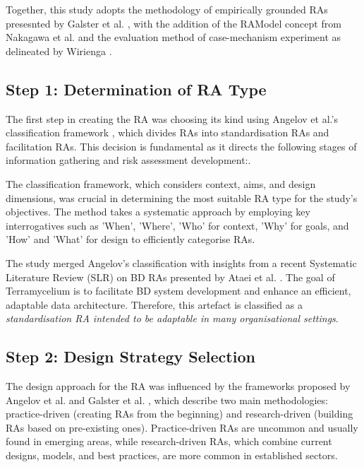 \documentclass[preprint,12pt]{elsarticle}
\begin{document}
Together, this study adopts the methodology of empirically grounded RAs presesnted by Galster et al. \cite{GALSTER2011Empirically}, with the addition of the RAModel concept from Nakagawa et al. \cite{nakagawa2012ramodel} and the evaluation method of case-mechanism experiment as delineated by Wirienga \cite{wieringa2014design}. 

\subsection{Step 1: Determination of RA Type}

The first step in creating the RA was choosing its kind using Angelov et al.'s classification framework \cite{angelov2009classification}, which divides RAs into standardisation RAs and facilitation RAs. This decision is fundamental as it directs the following stages of information gathering and risk assessment development:. 

The classification framework, which considers context, aims, and design dimensions, was crucial in determining the most suitable RA type for the study's objectives. The method takes a systematic approach by employing key interrogatives such as 'When', 'Where', 'Who' for context, 'Why' for goals, and 'How' and 'What' for design to efficiently categorise RAs.

The study merged Angelov's classification with insights from a recent Systematic Literature Review (SLR) on BD RAs presented by Ataei et al. \cite{ataei2022state}. The goal of Terramycelium is to facilitate BD system development and enhance an efficient, adaptable data architecture. Therefore, this artefact is classified as a \emph{standardisation RA intended to be adaptable in many organisational settings}.

\subsection{Step 2: Design Strategy Selection}

The design approach for the RA was influenced by the frameworks proposed by Angelov et al. \cite{angelov2012framework} and Galster et al. \cite{GALSTER2011Empirically}, which describe two main methodologies: practice-driven (creating RAs from the beginning) and research-driven (building RAs based on pre-existing ones). Practice-driven RAs are uncommon and usually found in emerging areas, while research-driven RAs, which combine current designs, models, and best practices, are more common in established sectors.
\end{document}
